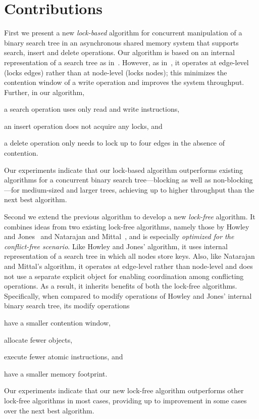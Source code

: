 \section{Contributions}
First we present a new \emph{lock-based} algorithm for concurrent manipulation of a binary search tree in an asynchronous shared memory system that supports search, insert and delete operations. Our algorithm is based on an internal representation of a search tree as in~\cite{DraVec+:2014:PPoPP,ArbAtt:2014:PODC}. However, as in~\cite{NatMit:2014:PPoPP}, it operates at edge-level (locks edges) rather than at node-level (locks nodes); this minimizes the contention window of a write operation and improves the system throughput. 
Further, in our algorithm, 
\begin{enumerate*}[label=(\roman*)]
\item a search operation uses only read and write instructions, 
\item an insert operation does not acquire any locks, and
\item a delete operation only needs to lock up to four edges in the absence of contention.
\end{enumerate*}
Our experiments indicate that our lock-based algorithm outperforms existing algorithms for a concurrent binary search 
tree---blocking as well as non-blocking---for medium-sized and larger trees, achieving up to \castleMaximumgap{} higher throughput than the next best algorithm.

Second we extend the previous algorithm to develop a new \emph{lock-free} algorithm. It combines ideas from two existing lock-free algorithms, namely those by Howley and Jones~\cite{HowJon:2012:SPAA} and Natarajan and Mittal~\cite{NatMit:2014:PPoPP}, and is especially \emph{optimized for the conflict-free scenario}. Like Howley and Jones' algorithm, it uses internal representation of a search tree in which all nodes store keys. Also, like Natarajan and Mittal's algorithm, it operates at edge-level rather than node-level and does not use a separate explicit object for enabling coordination among conflicting operations. As a result, it inherits benefits of both the lock-free algorithms. Specifically, when compared to modify operations of Howley and Jones' internal binary search tree, its modify operations 
\begin{enumerate*}[label=(\alph*)]
\item have a smaller contention window, 
\item allocate fewer objects, 
\item execute fewer atomic instructions, and 
\item have a smaller memory footprint. 
\end{enumerate*}
Our experiments indicate that our new lock-free algorithm outperforms other lock-free algorithms in most cases, providing up to \icdcnMaximumgap{} improvement in some cases over the next best algorithm.

